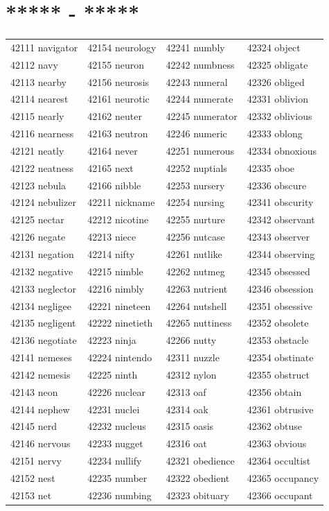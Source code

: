 \documentclass[10pt, oneside]{book}
\begin{document}
\begin{table}[h]
	\centering
	\section*{***** - *****}
	\begin{tabular}{l l l l}
42111 navigator &42154 neurology &42241 numbly &42324 object\\
42112 navy &42155 neuron &42242 numbness &42325 obligate\\
42113 nearby &42156 neurosis &42243 numeral &42326 obliged\\
42114 nearest &42161 neurotic &42244 numerate &42331 oblivion\\
42115 nearly &42162 neuter &42245 numerator &42332 oblivious\\
42116 nearness &42163 neutron &42246 numeric &42333 oblong\\
42121 neatly &42164 never &42251 numerous &42334 obnoxious\\
42122 neatness &42165 next &42252 nuptials &42335 oboe\\
42123 nebula &42166 nibble &42253 nursery &42336 obscure\\
42124 nebulizer &42211 nickname &42254 nursing &42341 obscurity\\
42125 nectar &42212 nicotine &42255 nurture &42342 observant\\
42126 negate &42213 niece &42256 nutcase &42343 observer\\
42131 negation &42214 nifty &42261 nutlike &42344 observing\\
42132 negative &42215 nimble &42262 nutmeg &42345 obsessed\\
42133 neglector &42216 nimbly &42263 nutrient &42346 obsession\\
42134 negligee &42221 nineteen &42264 nutshell &42351 obsessive\\
42135 negligent &42222 ninetieth &42265 nuttiness &42352 obsolete\\
42136 negotiate &42223 ninja &42266 nutty &42353 obstacle\\
42141 nemeses &42224 nintendo &42311 nuzzle &42354 obstinate\\
42142 nemesis &42225 ninth &42312 nylon &42355 obstruct\\
42143 neon &42226 nuclear &42313 oaf &42356 obtain\\
42144 nephew &42231 nuclei &42314 oak &42361 obtrusive\\
42145 nerd &42232 nucleus &42315 oasis &42362 obtuse\\
42146 nervous &42233 nugget &42316 oat &42363 obvious\\
42151 nervy &42234 nullify &42321 obedience &42364 occultist\\
42152 nest &42235 number &42322 obedient &42365 occupancy\\
42153 net &42236 numbing &42323 obituary &42366 occupant\\
	\end{tabular}
 \end{table}
\end{document}
